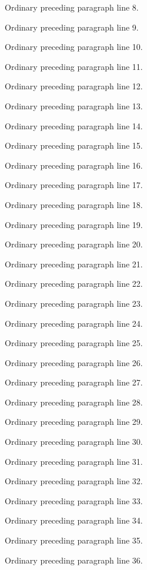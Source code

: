 \documentclass[11pt]{article}
\begin{document}
\noindent Ordinary preceding paragraph line 8.\par
\noindent Ordinary preceding paragraph line 9.\par
\noindent Ordinary preceding paragraph line 10.\par
\noindent Ordinary preceding paragraph line 11.\par
\noindent Ordinary preceding paragraph line 12.\par
\noindent Ordinary preceding paragraph line 13.\par
\noindent Ordinary preceding paragraph line 14.\par
\noindent Ordinary preceding paragraph line 15.\par
\noindent Ordinary preceding paragraph line 16.\par
\noindent Ordinary preceding paragraph line 17.\par
\noindent Ordinary preceding paragraph line 18.\par
\noindent Ordinary preceding paragraph line 19.\par
\noindent Ordinary preceding paragraph line 20.\par
\noindent Ordinary preceding paragraph line 21.\par
\noindent Ordinary preceding paragraph line 22.\par
\noindent Ordinary preceding paragraph line 23.\par
\noindent Ordinary preceding paragraph line 24.\par
\noindent Ordinary preceding paragraph line 25.\par
\noindent Ordinary preceding paragraph line 26.\par
\noindent Ordinary preceding paragraph line 27.\par
\noindent Ordinary preceding paragraph line 28.\par
\noindent Ordinary preceding paragraph line 29.\par
\noindent Ordinary preceding paragraph line 30.\par
\noindent Ordinary preceding paragraph line 31.\par
\noindent Ordinary preceding paragraph line 32.\par
\noindent Ordinary preceding paragraph line 33.\par
\noindent Ordinary preceding paragraph line 34.\par
\noindent Ordinary preceding paragraph line 35.\par
\noindent Ordinary preceding paragraph line 36.\par
\end{document}
